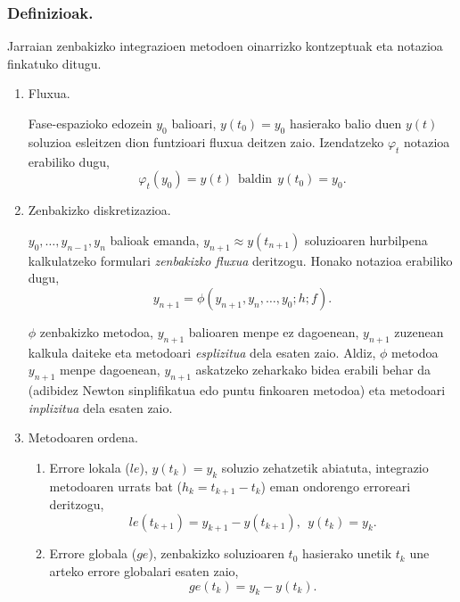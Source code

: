\subsubsection*{Definizioak.}  
Jarraian zenbakizko integrazioen metodoen oinarrizko kontzeptuak eta notazioa finkatuko ditugu.
\begin{enumerate}
\item Fluxua.

Fase-espazioko edozein $y_0$ balioari, $y(t_0)=y_0$ hasierako balio duen $y(t)$ soluzioa esleitzen dion funtzioari fluxua deitzen zaio. Izendatzeko $\varphi_t$ notazioa erabiliko dugu,
\begin{equation*}
\label{eq:fluxua}
\varphi_t(y_0)=y(t) \ \ \mbox{baldin}  \ \  y(t_0)=y_0.
\end{equation*}

\item Zenbakizko diskretizazioa.

$y_0, \dots,y_{n-1},y_{n}$ balioak emanda, $y_{n+1}\approx y(t_{n+1})$ soluzioaren hurbilpena kalkulatzeko formulari \emph{zenbakizko fluxua} deritzogu. Honako notazioa erabiliko dugu,
\begin{equation*}\label{eq:204}
y_{n+1}=\phi(y_{n+1},y_{n},\dots,y_0;h;f).
\end{equation*}

$\phi$ zenbakizko metodoa, $y_{n+1}$ balioaren menpe ez dagoenean, $y_{n+1}$ zuzenean kalkula daiteke eta metodoari \emph{esplizitua} dela esaten zaio. Aldiz, $\phi$ metodoa $y_{n+1}$ menpe dagoenean, $y_{n+1}$ askatzeko zeharkako bidea erabili behar da (adibidez Newton sinplifikatua edo puntu finkoaren metodoa) eta metodoari \emph{inplizitua} dela esaten zaio.  

\item Metodoaren ordena.

\begin{enumerate}
\item Errore lokala ($le$), $y(t_k)=y_k$ soluzio zehatzetik abiatuta, integrazio metodoaren urrats bat ($h_k=t_{k+1}-t_k$) eman ondorengo erroreari deritzogu,
\begin{equation*}
\label{eq:le}
le(t_{k+1})=y_{k+1}-y(t_{k+1}), \ \ y(t_k)=y_k.
\end{equation*}   


\item Errore globala ($ge$), zenbakizko soluzioaren $t_0$ hasierako unetik $t_k$ une arteko errore globalari esaten zaio,
\begin{equation*}
 \label{eq:ge}
ge(t_k)=y_k-y(t_k).
\end{equation*}


\end{enumerate}
\end{enumerate}
